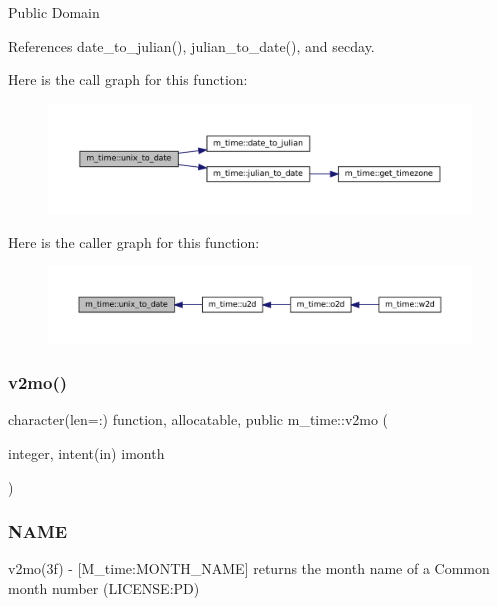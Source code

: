 Public Domain 

References date\+\_\+to\+\_\+julian(), julian\+\_\+to\+\_\+date(), and secday.

Here is the call graph for this function\+:\nopagebreak
\begin{figure}[H]
\begin{center}
\leavevmode
\includegraphics[width=350pt]{namespacem__time_acc62ada23f8fa2fe67b428702fbcbf1c_cgraph}
\end{center}
\end{figure}
Here is the caller graph for this function\+:
\nopagebreak
\begin{figure}[H]
\begin{center}
\leavevmode
\includegraphics[width=350pt]{namespacem__time_acc62ada23f8fa2fe67b428702fbcbf1c_icgraph}
\end{center}
\end{figure}
\mbox{\label{namespacem__time_a6f28cf00e4998bb50bb503f5e4bd3f77}} 
\subsubsection{\texorpdfstring{v2mo()}{v2mo()}}
{\footnotesize\ttfamily character(len=\+:) function, allocatable, public m\+\_\+time\+::v2mo (\begin{DoxyParamCaption}\item[{integer, intent(in)}]{imonth }\end{DoxyParamCaption})}



\subsubsection*{N\+A\+ME}

v2mo(3f) -\/ \mbox{[}M\+\_\+time\+:M\+O\+N\+T\+H\+\_\+\+N\+A\+ME\mbox{]} returns the month name of a Common month number (L\+I\+C\+E\+N\+SE\+:PD) 

